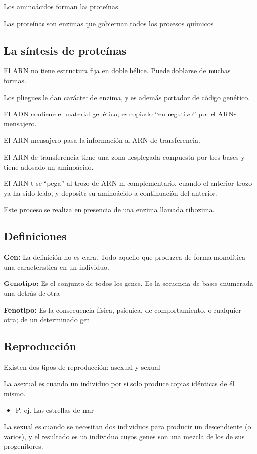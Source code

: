 \documentclass[12pt, twoside, openright]{report} %
\begin{document}
Los aminoácidos forman las proteínas.

Las proteínas son enzimas que gobiernan todos los procesos químicos.

\subsection{La síntesis de proteínas}
El ARN no tiene estructura fija en doble hélice. Puede doblarse de muchas formas.

Los pliegues le dan carácter de enzima, y es además portador de código genético.

El ADN contiene el material genético, es copiado “en negativo” por el ARN-mensajero.

El ARN-mensajero pasa la información al ARN-de transferencia.

El ARN-de transferencia tiene una zona desplegada compuesta por tres bases y tiene adosado un aminoácido.

El ARN-t se “pega” al trozo de ARN-m complementario, cuando el anterior trozo ya ha sido leído, y deposita su aminoácido a continuación del anterior.

Este proceso se realiza en presencia de una enzima llamada ribozima.

\subsection{Definiciones}
\textbf{Gen:} La definición no es clara. Todo aquello que produzca de forma monolítica una característica en un individuo.

\textbf{Genotipo:} Es el conjunto de todos los genes. Es la secuencia de bases enumerada una detrás de otra

\textbf{Fenotipo:} Es la consecuencia física, psíquica, de comportamiento, o cualquier otra; de un determinado gen

\subsection{Reproducción}
Existen dos tipos de reproducción: asexual y sexual

La asexual es cuando un individuo por sí solo produce copias idénticas de él mismo.
\begin{itemize}
	\item P. ej. Las estrellas de mar
\end{itemize}

La sexual es cuando se necesitan dos individuos para producir un descendiente (o varios), y el resultado es un individuo cuyos genes son una mezcla de los de sus progenitores.
\end{document}
